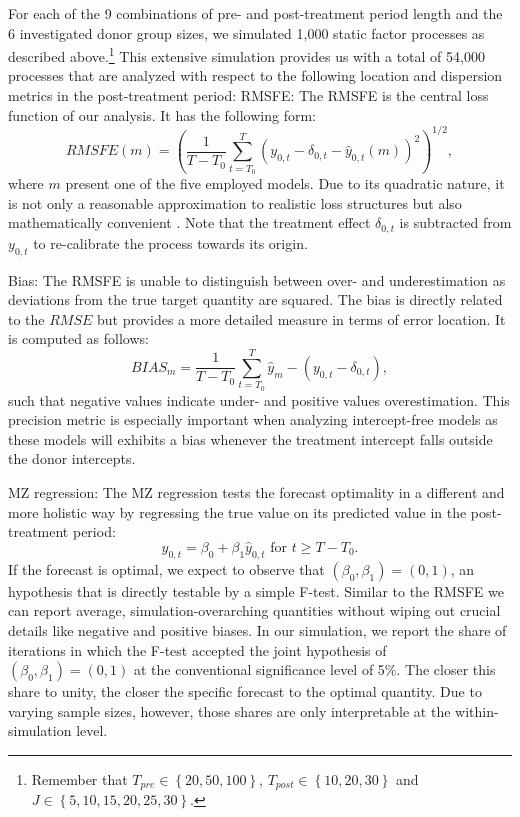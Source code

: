 For each of the 9 combinations of pre- and post-treatment period length and the 6 investigated donor group sizes, we simulated 1,000 static factor processes as described above.\footnote{Remember that $T_{pre} \in \left\lbrace 20,50,100\right\rbrace $, $T_{post} \in \left\lbrace 10,20,30\right\rbrace$ and $J \in \left\lbrace 5,10,15,20,25,30\right\rbrace$.} This extensive simulation provides us with a total of 54,000 processes that are analyzed with respect to the following location and dispersion metrics in the post-treatment period:
\ac{RMSFE}: The \ac{RMSFE} is the central loss function of our analysis. It has the following form:
$$RMSFE(m) = \left(\frac{1}{T - T_0} \sum_{t = T_0}^{T} \left( y_{0,t} - \delta_{0,t} - \widehat{y}_{0,t}(m)\right) ^2 \right)^{1/2},$$
where $m$ present one of the five employed models. Due to its quadratic nature, it is not only a reasonable approximation to realistic loss structures but also mathematically convenient \cite{diebold:2017}. Note that the treatment effect $\delta_{0,t}$ is subtracted from $y_{0,t}$ to re-calibrate the process towards its origin.  
	
Bias: The \ac{RMSFE} is unable to distinguish between over- and underestimation as deviations from the true target quantity are squared. The bias is directly related to the $RMSE$ but provides a more detailed measure in terms of error location. It is computed as follows:
$$BIAS_m = \frac{1}{T - T_0} \sum_{t = T_0}^{T} \widehat{y}_m - (y_{0,t} - \delta_{0,t}),$$
such that negative values indicate under- and positive values overestimation. This precision metric is especially important when analyzing intercept-free models as these models will exhibits a bias whenever the treatment intercept falls outside the donor intercepts. 

\ac{MZ} regression: The \ac{MZ} regression tests the forecast optimality in a different and more holistic way by regressing the true value on its predicted value in the post-treatment period: 
$$y_{0,t} = \beta_0 + \beta_1 \widehat{y}_{0,t} \text{ for } t \geq T- T_0.$$
If the forecast is optimal, we expect to observe that $(\beta_0, \beta_1) = (0,1)$, an hypothesis that is directly testable by a simple F-test. Similar to the \ac{RMSFE} we can report average, simulation-overarching quantities without wiping out crucial details like negative and positive biases. In our simulation, we report the share of iterations in which the F-test accepted the joint hypothesis of $(\beta_0, \beta_1) = (0,1)$ at the conventional significance level of 5\%. The closer this share to unity, the closer the specific forecast to the optimal quantity. Due to varying sample sizes, however, those shares are only interpretable at the within-simulation level.
	
